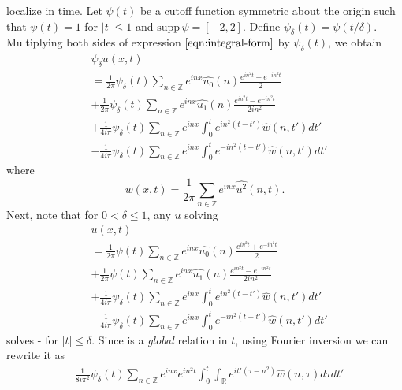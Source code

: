 \documentclass[12pt,reqno]{amsart}
\numberwithin{equation}{section}  %
\renewcommand{\cref}{\Cref}
\newcommand{\rr}{\mathbb{R}}
\newcommand{\zz}{\mathbb{Z}}
\newcommand{\wh}{\widehat}
\begin{document}
localize in time. 
Let $\psi(t)$ be a cutoff function symmetric about the 
origin such that $\psi(t) = 1$ for $|t| \le 1$ and $\text{supp} \, \psi 
= [-2, 2 ]$.
Define $\psi_{\delta}(t) = \psi(t/\delta)$.  Multiplying both sides of expression
$\cref{eqn:integral-form}$ by $\psi_{\delta}(t)$, we obtain
%
%
\begin{align}
  & \psi_{\delta}u(x,t) 
  \label{1hh}
    \\
    & = \frac{1}{2 \pi}\psi_{\delta}(t)
    \sum_{n \in \zz} e^{inx} \wh{u_{0}}(n) \frac{e^{in^{2}t} + e^{-in^{2}t}}{2} 
    \\
    \label{2hh}
    & + \frac{1}{2 \pi}\psi_{\delta}(t) \sum_{n \in \zz} e^{inx}
    \wh{u_{1}}(n)\frac{e^{in^{2}t} - e^{-in^{2}t}}{2 i n^{2}} 
    \\
    \label{3hh}
    & + \frac{1}{4 i \pi}\psi_{\delta}(t) \sum_{n \in \zz} e^{inx}
    \int_{0}^{t}e^{in^{2}(t-t')}
    \wh{w}(n, t') dt'
    \\
    \label{4hh}
    & - \frac{1}{4 i \pi}\psi_{\delta}(t) \sum_{n \in \zz} e^{inx}
    \int_{0}^{t}e^{-in^{2}(t-t')}
    \wh{w}(n, t') dt'
  \end{align}
where $$w(x,t) = \frac{1}{2\pi} \sum_{n \in \zz}
e^{inx} \wh{u^{2}}(n,t).$$  Next, note that for $0 < \delta \le 1$, any $u$
solving
\begin{align}
  & u(x,t) 
    \\
    & = \frac{1}{2 \pi}\psi(t)
    \sum_{n \in \zz} e^{inx} \wh{u_{0}}(n) \frac{e^{in^{2}t} + e^{-in^{2}t}}{2} 
    \\
    & + \frac{1}{2 \pi}\psi(t) \sum_{n \in \zz} e^{inx}
    \wh{u_{1}}(n)\frac{e^{in^{2}t} - e^{-in^{2}t}}{2 i n^{2}} 
    \\
    \label{term-3}
    & + \frac{1}{4 i \pi} \psi_{\delta}(t) \sum_{n \in \zz} e^{inx}
    \int_{0}^{t}e^{in^{2}(t-t')}
    \wh{w}(n, t') dt'
    \\
    \label{term-4}
    & - \frac{1}{4 i \pi} \psi_{\delta} (t) \sum_{n \in \zz} e^{inx}
    \int_{0}^{t}e^{-in^{2}(t-t')}
    \wh{w}(n, t') dt'
  \end{align}
  solves \cref{1hh}-\cref{4hh} for $| t | \le \delta$.
  Since \cref{term-3} is a \emph{global} relation in
  $t$, using Fourier inversion we can rewrite it as
%
%
\begin{equation*}
\begin{split}
  & \frac{1}{8 i \pi^{2}}  \psi_{\delta}(t) \sum_{n \in \zz} e^{inx} e^{in^{2}t}
  \int_{0}^{t} \int_{\rr} e^{it'(\tau - n^{2})} \wh{w}(n, \tau) d \tau dt'
\end{split}
\end{equation*}
\end{document}
